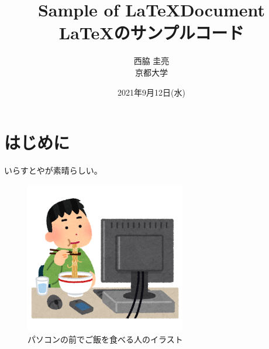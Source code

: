 \documentclass[uplatex]{jsarticle}
\begin{document}
\title{\bf{\LARGE{Sample of \LaTeX  Document} \\ \Large{\LaTeX のサンプルコード}}}
\author{西脇 圭亮\\京都大学}
\date{2021年9月12日(水)}
\maketitle

\section{はじめに}

いらすとやが素晴らしい。
\cite{art1}

\begin{figure}[h]
    \begin{center}
        \includegraphics[width=7cm]{../images/syokuji_computer.png}
        \caption{パソコンの前でご飯を食べる人のイラスト}
        \label{fig:syokuji_computer}
    \end{center}
\end{figure}

% 
\end{document}
